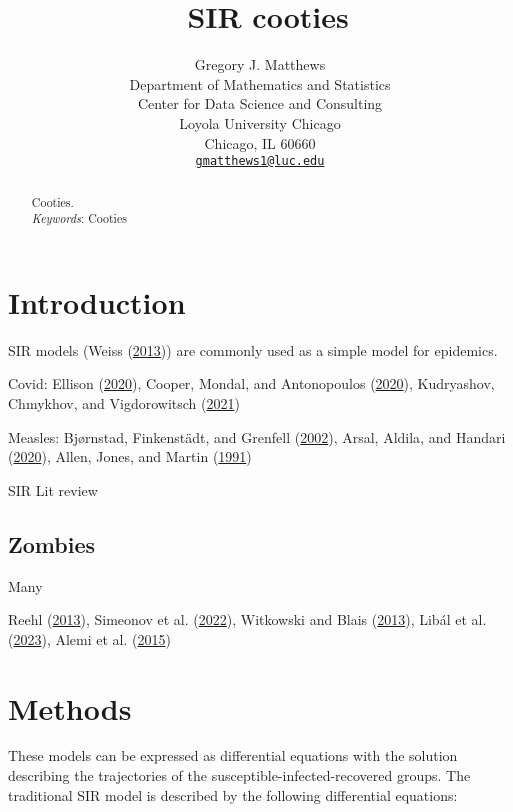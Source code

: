 \documentclass[
  12pt,
]{article}
\title{~\Large SIR cooties}
\author{\large Gregory J. Matthews \vspace{-1.1mm}\\
\normalsize Department of Mathematics and Statistics \vspace{-1mm}\\
\normalsize Center for Data Science and Consulting \vspace{-1mm}\\
\normalsize Loyola University Chicago \vspace{-1mm}\\
\normalsize Chicago, IL 60660 \vspace{-1mm}\\
\normalsize \href{mailto:gmatthews1@luc.edu}{\texttt{gmatthews1@luc.edu}}
\vspace{-1mm}}
\date{}
\begin{document}
\maketitle
\begin{abstract}
Cooties. \vspace{2mm}\\
\emph{Keywords}: Cooties
\end{abstract}

\newpage

\hypertarget{sec:intro}{%
\section{Introduction}\label{sec:intro}}

SIR models (Weiss (\protect\hyperlink{ref-weiss2013sir}{2013})) are
commonly used as a simple model for epidemics.

Covid: Ellison (\protect\hyperlink{ref-ellison2020implications}{2020}),
Cooper, Mondal, and Antonopoulos
(\protect\hyperlink{ref-cooper2020sir}{2020}), Kudryashov, Chmykhov, and
Vigdorowitsch (\protect\hyperlink{ref-kudryashov2021analytical}{2021})

Measles: Bjørnstad, Finkenstädt, and Grenfell
(\protect\hyperlink{ref-bjornstad2002dynamics}{2002}), Arsal, Aldila,
and Handari (\protect\hyperlink{ref-arsal2020short}{2020}), Allen,
Jones, and Martin (\protect\hyperlink{ref-allen1991discrete}{1991})

SIR Lit review

\hypertarget{zombies}{%
\subsection{Zombies}\label{zombies}}

Many

Reehl (\protect\hyperlink{ref-reehl2013zombie}{2013}), Simeonov et al.
(\protect\hyperlink{ref-simeonov2022humans}{2022}), Witkowski and Blais
(\protect\hyperlink{ref-witkowski2013bayesian}{2013}), Libál et al.
(\protect\hyperlink{ref-libal2023transition}{2023}), Alemi et al.
(\protect\hyperlink{ref-alemi2015you}{2015})

\hypertarget{sec:methods}{%
\section{Methods}\label{sec:methods}}

These models can be expressed as differential equations with the
solution describing the trajectories of the
susceptible-infected-recovered groups. The traditional SIR model is
described by the following differential equations:
\end{document}
